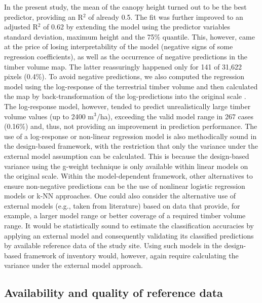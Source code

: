 In the present study, the mean of the canopy height turned out to be the best predictor, providing an R$^2$ of already 0.5. The fit was further improved to an adjusted R$^2$ of 0.62 by extending the model using the predictor variables standard deviation, maximum height and the 75\% quantile. This, however, came at the price of losing interpretability of the model (negative signs of some regression coefficients), as well as the occurrence of negative predictions in the timber volume map. The latter reassuringly happened only for 141 of 31,622 pixels (0.4\%). To avoid negative predictions, we also computed the regression model using the log-response of the terrestrial timber volume and then calculated the map by back-transformation of the log-predictions into the original scale \citep{beauchamp1973}. The log-response model, however, tended to predict unrealistically large timber volume values (up to 2400 m$^3$/ha), exceeding the valid model range in 267 cases (0.16\%) and, thus, not providing an improvement in prediction performance. The use of a log-response or non-linear regression model is also methodically sound in the design-based framework, with the restriction that only the variance under the external model assumption \citep{mandallaz2008} can be calculated. This is because the design-based variance using the g-weight technique \citep{mandallaz2013b, mandallaz2013a} is only available within linear models on the original scale. Within the model-dependent framework, other alternatives to ensure non-negative predictions can be the use of nonlinear logistic regression models \citep{mcroberts2013} or k-NN approaches. One could also consider the alternative use of external models (e.g., taken from literature) based on data that provide, for example, a larger model range or better coverage of a required timber volume range. It would be statistically sound to estimate the classification accuracies by applying an external model and consequently validating its classified predictions by available reference data of the study site. Using such models in the design-based framework of inventory would, however, again require calculating the variance under the external model approach.

\subsection{Availability and quality of reference data}
\label{sec:refdata}

